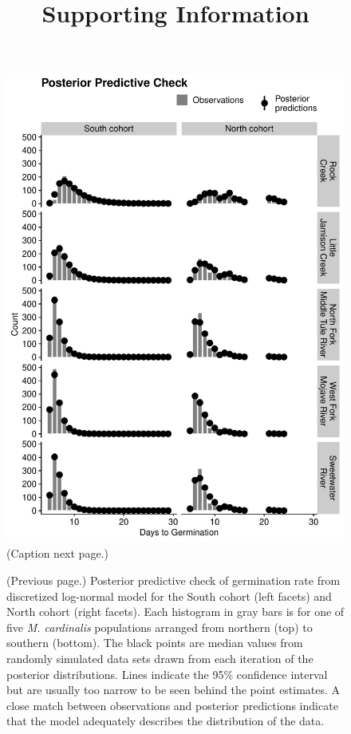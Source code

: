 \documentclass[
  12pt,
]{article}
\title{Supporting Information}
\author{}
\date{\vspace{-2.5em}}
\makeatletter
\newcommand\iraggedright{%
  \let\\\@centercr\@rightskip\@flushglue \rightskip\@rightskip
  \leftskip\z@skip}
\makeatother
\begin{document}
\maketitle

\iraggedright

\newcommand{\pkg}[1]{{\fontseries{b}\selectfont #1}} 

\renewcommand\thefigure{S\arabic{figure}}    
\renewcommand\thetable{S\arabic{table}}    
\setcounter{figure}{0}    
\setcounter{table}{0}

\begin{figure}[ht]
  \includegraphics[width=\textwidth]{figures/pp_check_germ.pdf}
  \caption{(Caption next page.)}
  \label{fig:pp_check}
\end{figure}
\addtocounter{figure}{-1}
\begin{figure} [t!]
  \caption{(Previous page.) Posterior predictive check of germination rate from discretized log-normal model for the South cohort (left facets) and North cohort (right facets). Each histogram in gray bars is for one of five \textit{M. cardinalis} populations arranged from northern (top) to southern (bottom). The black points are median values from randomly simulated data sets drawn from each iteration of the posterior distributions. Lines indicate the 95\% confidence interval but are usually too narrow to be seen behind the point estimates. A close match between observations and posterior predictions indicate that the model adequately describes the distribution of the data.}
\end{figure}
\end{document}
